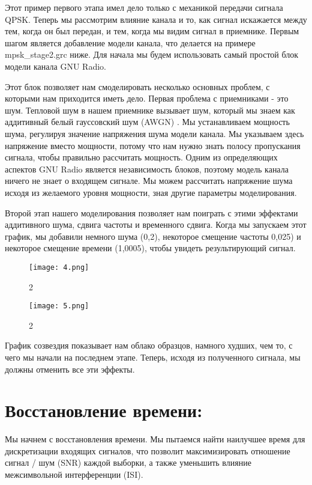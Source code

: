 \documentclass[10pt,a4paper,oneside]{article}
\begin{document}
Этот пример первого этапа имел дело только с механикой передачи сигнала QPSK. Теперь мы рассмотрим влияние канала и то, как сигнал искажается между тем, когда он был передан, и тем, когда мы видим сигнал в приемнике. Первым шагом является добавление модели канала, что делается на примере mpsk_stage2.grc ниже. Для начала мы будем использовать самый простой блок модели канала GNU Radio.

Этот блок позволяет нам смоделировать несколько основных проблем, с которыми нам приходится иметь дело. Первая проблема с приемниками - это шум. Тепловой шум в нашем приемнике вызывает шум, который мы знаем как аддитивный белый гауссовский шум (AWGN) . Мы устанавливаем мощность шума, регулируя значение напряжения шума модели канала. Мы указываем здесь напряжение вместо мощности, потому что нам нужно знать полосу пропускания сигнала, чтобы правильно рассчитать мощность. Одним из определяющих аспектов GNU Radio является независимость блоков, поэтому модель канала ничего не знает о входящем сигнале. Мы можем рассчитать напряжение шума исходя из желаемого уровня мощности, зная другие параметры моделирования.

Второй этап нашего моделирования позволяет нам поиграть с этими эффектами аддитивного шума, сдвига частоты и временного сдвига. Когда мы запускаем этот график, мы добавили немного шума (0,2), некоторое смещение частоты 0,025) и некоторое смещение времени (1,0005), чтобы увидеть результирующий сигнал.

\begin{figure}[H]
        \centering
        \texttt{[image: 4.png]}
        \caption{2}
        \label{fig:first}
\end{figure}

\begin{figure}[H]
        \centering
        \texttt{[image: 5.png]}
        \caption{2}
        \label{fig:first}
\end{figure}

График созвездия показывает нам облако образцов, намного худших, чем то, с чего мы начали на последнем этапе. Теперь, исходя из полученного сигнала, мы должны отменить все эти эффекты.

\section{Восстановление времени:}

Мы начнем с восстановления времени. Мы пытаемся найти наилучшее время для дискретизации входящих сигналов, что позволит максимизировать отношение сигнал / шум (SNR) каждой выборки, а также уменьшить влияние межсимвольной интерференции (ISI).
\end{document}
